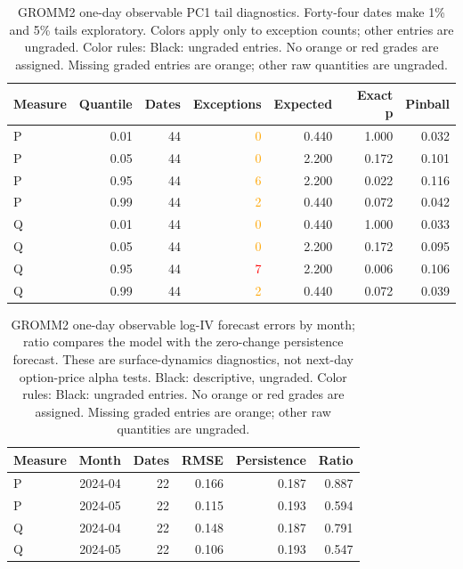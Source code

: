 \documentclass[11pt]{article}
\begin{document}
\begin{table}[H]\centering\small\setlength{\tabcolsep}{4pt}
\caption{GROMM2 one-day observable PC1 tail diagnostics. Forty-four dates make 1\% and 5\% tails exploratory. Colors apply only to exception counts; other entries are ungraded. Color rules: Black: ungraded entries. No orange or red grades are assigned. Missing graded entries are orange; other raw quantities are ungraded.}\label{tab:gromm2-tails}
\begin{tabular}{@{}lrrrrrr@{}}
\toprule
Measure & Quantile & Dates & Exceptions & Expected & Exact p & Pinball \\
\midrule
P & 0.01 & 44 & \textcolor{orange}{0} & 0.440 & 1.000 & 0.032 \\
P & 0.05 & 44 & \textcolor{orange}{0} & 2.200 & 0.172 & 0.101 \\
P & 0.95 & 44 & \textcolor{orange}{6} & 2.200 & 0.022 & 0.116 \\
P & 0.99 & 44 & \textcolor{orange}{2} & 0.440 & 0.072 & 0.042 \\
Q & 0.01 & 44 & \textcolor{orange}{0} & 0.440 & 1.000 & 0.033 \\
Q & 0.05 & 44 & \textcolor{orange}{0} & 2.200 & 0.172 & 0.095 \\
Q & 0.95 & 44 & \textcolor{red}{7} & 2.200 & 0.006 & 0.106 \\
Q & 0.99 & 44 & \textcolor{orange}{2} & 0.440 & 0.072 & 0.039 \\
\bottomrule\end{tabular}\end{table}

\begin{table}[H]\centering\small\setlength{\tabcolsep}{4pt}
\caption{GROMM2 one-day observable log-IV forecast errors by month; ratio compares the model with the zero-change persistence forecast. These are surface-dynamics diagnostics, not next-day option-price alpha tests. Black: descriptive, ungraded. Color rules: Black: ungraded entries. No orange or red grades are assigned. Missing graded entries are orange; other raw quantities are ungraded.}\label{tab:gromm2-monthly}
\begin{tabular}{@{}lrrrrr@{}}
\toprule
Measure & Month & Dates & RMSE & Persistence & Ratio \\
\midrule
P & 2024-04 & 22 & 0.166 & 0.187 & 0.887 \\
P & 2024-05 & 22 & 0.115 & 0.193 & 0.594 \\
Q & 2024-04 & 22 & 0.148 & 0.187 & 0.791 \\
Q & 2024-05 & 22 & 0.106 & 0.193 & 0.547 \\
\bottomrule\end{tabular}\end{table}
\end{document}
